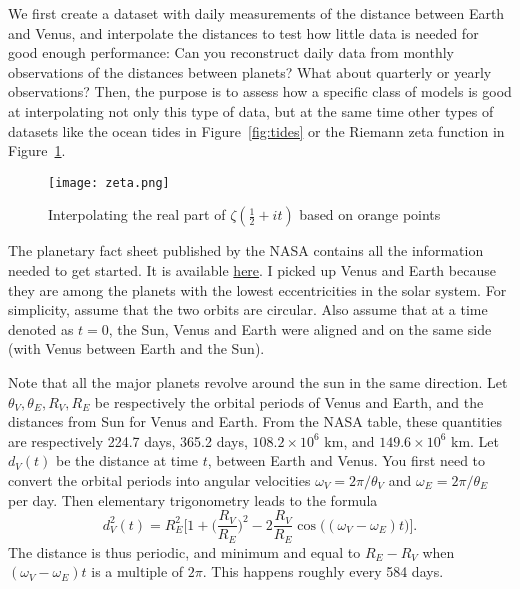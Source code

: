 \documentclass[oneside,10pt]{book}
\begin{document}

We first create a dataset with daily measurements of the distance between Earth and Venus, and interpolate the distances to test how little data is needed for good enough performance: 
Can you reconstruct daily data from monthly observations of the distances between planets? What about quarterly or yearly observations? Then, the purpose is to assess how a specific class of models is good at interpolating not only this type of data, but at the same time other types of datasets like the ocean tides in Figure~\ref{fig:tides} or the Riemann zeta function in
 Figure~\ref{fig:zeta}.

\begin{figure}[H]
\centering
\texttt{[image: zeta.png]} %
\caption{Interpolating the real part of $\zeta(\frac{1}{2}+it)$ based on orange points}
\label{fig:zeta}
\end{figure}

The planetary fact sheet published by the NASA contains all the information needed to get started. 
It is available \href{https://nssdc.gsfc.nasa.gov/planetary/factsheet/}{here}. I picked up Venus and Earth because they are among the planets with the lowest eccentricities in the solar system. For simplicity, assume that the two orbits are circular. Also assume that at a time denoted as $t=0$, the Sun, Venus and Earth were aligned and on the same side (with Venus between Earth and the Sun). 

Note that all the major planets revolve around the sun in the same direction. 
Let $\theta_V, \theta_E, R_V, R_E$ be respectively the orbital periods of Venus and Earth, and the  distances from Sun for Venus and Earth.  From the NASA table, these quantities are respectively 224.7 days, 365.2 days, $108.2\times 10^6$ km, and 
$149.6  \times 10^6$ km. Let $d_V(t)$ be the distance at time $t$, between Earth and Venus. You first need to convert the orbital periods into angular velocities 
 $\omega_V = 2\pi/\theta_V$ and $\omega_E = 2\pi/\theta_E$ per day.  Then elementary trigonometry leads to the formula
\begin{equation}
d_V^2(t) = R_E^2\Bigg[1 + \Big(\frac{R_V}{R_E}\Big)^2 -2\frac{R_V}{R_E} \cos\Big((\omega_V-\omega_E)t\Big) \Bigg]. \label{resw}
\end{equation}
The distance is thus periodic, and minimum and equal to $R_E - R_V$ when  
$(\omega_V-\omega_E)t$ is a multiple of $2\pi$. This happens roughly every 584 days. 
\end{document}
